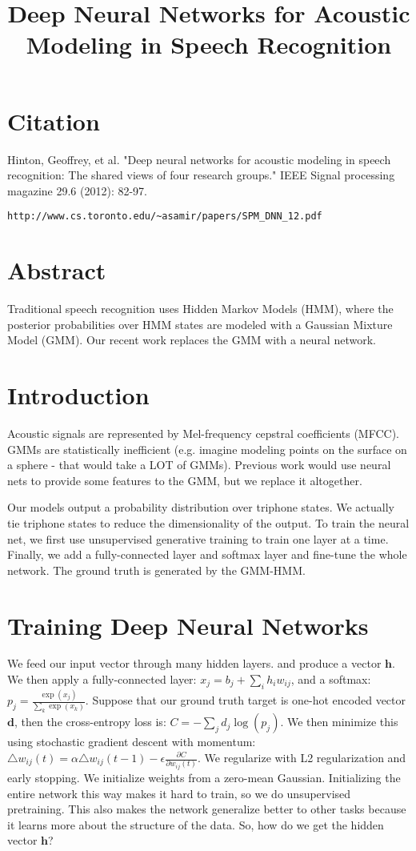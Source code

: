 \documentclass[a4paper]{article}
\title{Deep Neural Networks for Acoustic Modeling in Speech Recognition}
\date{}
\begin{document}
\maketitle

\section{Citation}
Hinton, Geoffrey, et al. "Deep neural networks for acoustic modeling in speech recognition: The shared views of four research groups." IEEE Signal processing magazine 29.6 (2012): 82-97.

\begin{verbatim}
http://www.cs.toronto.edu/~asamir/papers/SPM_DNN_12.pdf
\end{verbatim}

\section{Abstract}
Traditional speech recognition uses Hidden Markov Models (HMM), where the
posterior probabilities over HMM states are modeled with a Gaussian Mixture
Model (GMM). Our recent work replaces the GMM with a neural network.

\section{Introduction}
Acoustic signals are represented by Mel-frequency cepstral coefficients (MFCC).
GMMs are statistically inefficient (e.g. imagine modeling points on the surface
on a sphere - that would take a LOT of GMMs). Previous work would use neural
nets to provide some features to the GMM, but we replace it altogether.

Our models output a probability distribution over triphone states. We actually
tie triphone states to reduce the dimensionality of the output. To train the
neural net, we first use unsupervised generative training to train one layer at
a time. Finally, we add a fully-connected layer and softmax layer 
and fine-tune the whole network. The ground truth is generated by the GMM-HMM.

\section{Training Deep Neural Networks}
We feed our input vector through many hidden layers. and produce a vector 
$\mathbf{h}$. We then apply a fully-connected layer: $x_j = b_j + \sum_{i}{
h_i w_{ij}}$, and a softmax: $p_j = \frac{\exp(x_j)}{\sum_{k}{\exp(x_k)}}$.
Suppose that our ground truth target is one-hot encoded vector $\mathbf{d}$,
then the cross-entropy loss is: $C = - \sum_{j}{d_j \log(p_j)}$. We then
minimize this using stochastic gradient descent with momentum:
$\triangle w_{ij}(t) = \alpha \triangle w_{ij}(t - 1) - \epsilon \frac{
\partial C}{\partial w_{ij}(t)}$. We regularize with L2 regularization and
early stopping. We initialize weights from a zero-mean Gaussian. Initializing
the entire network this way makes it hard to train, so we do unsupervised
pretraining. This also makes the network generalize better to other tasks
because it learns more about the structure of the data. So, how do we get
the hidden vector $\mathbf{h}$?
\end{document}
